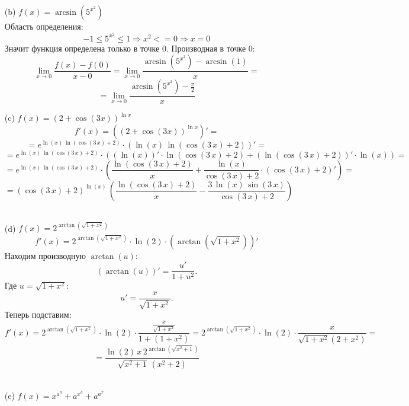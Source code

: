 \documentclass[a4paper]{article}
\renewcommand{\f}[2]{\frac{#1}{#2}}
\newcommand{\lm}[1]{\underset{#1}{\lim}}
\renewcommand{\r}{\Rightarrow}
\renewcommand{\leq}{\leqslant}
\begin{document}
\begin{enumerate}
\begin{enumerate}
        \item[(b)]$f(x) = \arcsin(5^{x^2})$\\
        Область определения:
        $$-1 \leq 5^{x^2} \leq 1 \r x^2 <= 0 \r x = 0$$
        Значит функция определена только в точке 0. Производная в точке 0:
        $$\lm{x \to 0}\f{f(x)-f(0)}{x-0} = \lm{x \to 0}\f{\arcsin(5^{x^2})-\arcsin(1)}{x} =$$
        $$=\lm{x \to 0}\f{\arcsin(5^{x^2})-\f{\pi}{2}}{x} $$
        

        \item[(c)]$ f(x) = (2 + \cos(3x))^{\ln x}$
        $$f'(x) = \left( (2 + \cos(3x))^{\ln x} \right)' =$$
        $$={e}^{\ln\left(x\right)\,\ln\left(\cos\left(3\,x\right)+2\right)}\cdot \left(\ln\left(x\right)\,\ln\left(\cos\left(3\,x\right)+2\right)\right)' = $$
        $$= {e}^{\ln\left(x\right)\,\ln\left(\cos\left(3\,x\right)+2\right)}\cdot \left(\left(\ln\left(x\right)\right)'\cdot \ln\left(\cos\left(3\,x\right)+2\right)+\left(\ln\left(\cos\left(3\,x\right)+2\right)\right)'\cdot \ln\left(x\right)\right) = $$
        $$= {e}^{\ln\left(x\right)\,\ln\left(\cos\left(3\,x\right)+2\right)}\cdot \left(\dfrac{\ln\left(\cos\left(3\,x\right)+2\right)}{x}+\dfrac{\ln\left(x\right)}{\cos\left(3\,x\right)+2}\cdot \left(\cos\left(3\,x\right)+2\right)'\right) =$$
        $$= \left({\cos\left(3\,x\right)+2}\right)^{\ln\left(x\right)}\,\left(\dfrac{\ln\left(\cos\left(3\,x\right)+2\right)}{x}-\dfrac{3\,\ln\left(x\right)\,\sin\left(3\,x\right)}{\cos\left(3\,x\right)+2}\right)$$\\
        
        \item[(d)]$ f(x) = 2^{\arctan(\sqrt{1 + x^2})}$
        $$f'(x) = 2^{\arctan(\sqrt{1 + x^2})} \cdot \ln(2) \cdot (\arctan(\sqrt{1 + x^2}))'$$
        Находим производную $ \arctan(u) $:
        $$
        (\arctan(u))' = \frac{u'}{1 + u^2}.
        $$
        Где $ u = \sqrt{1 + x^2} $:
        $$
        u' = \frac{x}{\sqrt{1 + x^2}}.
        $$
        Теперь подставим:
        $$
        f'(x) = 2^{\arctan(\sqrt{1 + x^2})} \cdot \ln(2) \cdot \frac{\frac{x}{\sqrt{1 + x^2}}}{1 + (1 + x^2)} = 2^{\arctan(\sqrt{1 + x^2})} \cdot \ln(2) \cdot \frac{x}{\sqrt{1 + x^2}(2 + x^2)}=
        $$
        $$=\dfrac{\ln\left(2\right)\,x\,{2}^{\operatorname{arctan}\left(\sqrt{{x}^{2}+1}\right)}}{\sqrt{{x}^{2}+1}\,\left({x}^{2}+2\right)}$$\\

        \item[(e)] $ f(x) = x^{a^a} + a^{x^a} + a^{a^x} $
        

\end{enumerate}
\end{enumerate}
\end{document}
